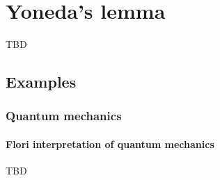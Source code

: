 \chapter{Yoneda's lemma}

TBD

\section{Examples}

\subsection{Quantum mechanics}

\subsubsection{Flori interpretation of quantum mechanics}
TBD
